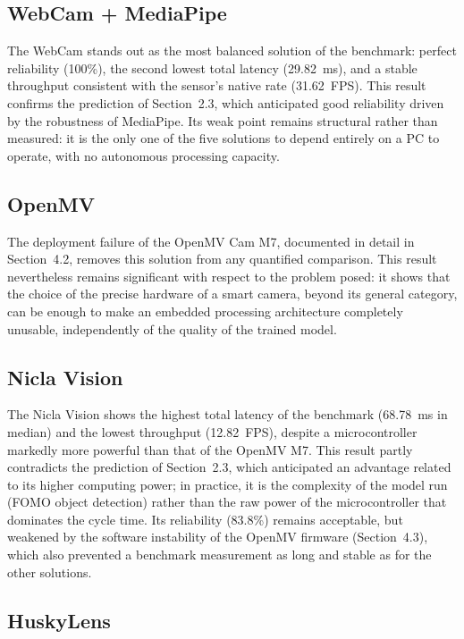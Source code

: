 \documentclass[12pt,a4paper]{report}
\begin{document}
	\subsection*{WebCam + MediaPipe}
	
	The WebCam stands out as the most balanced solution of the benchmark: perfect reliability (100\%), the second lowest total latency (29.82~ms), and a stable throughput consistent with the sensor's native rate (31.62~FPS). This result confirms the prediction of Section~2.3, which anticipated good reliability driven by the robustness of MediaPipe. Its weak point remains structural rather than measured: it is the only one of the five solutions to depend entirely on a PC to operate, with no autonomous processing capacity.
	
	\subsection*{OpenMV}
	
	The deployment failure of the OpenMV Cam M7, documented in detail in Section~4.2, removes this solution from any quantified comparison. This result nevertheless remains significant with respect to the problem posed: it shows that the choice of the precise hardware of a smart camera, beyond its general category, can be enough to make an embedded processing architecture completely unusable, independently of the quality of the trained model.
	
	\subsection*{Nicla Vision}
	
	The Nicla Vision shows the highest total latency of the benchmark (68.78~ms in median) and the lowest throughput (12.82~FPS), despite a microcontroller markedly more powerful than that of the OpenMV M7. This result partly contradicts the prediction of Section~2.3, which anticipated an advantage related to its higher computing power; in practice, it is the complexity of the model run (FOMO object detection) rather than the raw power of the microcontroller that dominates the cycle time. Its reliability (83.8\%) remains acceptable, but weakened by the software instability of the OpenMV firmware (Section~4.3), which also prevented a benchmark measurement as long and stable as for the other solutions.
	
	\subsection*{HuskyLens}
	
\end{document}
